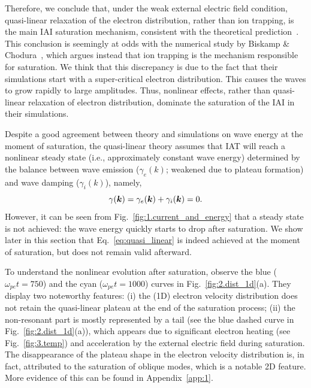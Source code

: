 \documentclass[%
 reprint,
 amsmath,
 amssymb,
 aps,
 prx,
floatfix,
superscriptaddress
]{revtex4-2}
\newcommand\bb[1]{\mbox{\boldmath{$#1$}}}
\begin{document}
Therefore, we conclude that, under the weak external electric field condition, quasi-linear relaxation of the electron distribution, rather than ion trapping, is the main IAI saturation mechanism, consistent with the theoretical prediction~\cite{bychenkov1988ion}. 
This conclusion is seemingly at odds with the numerical study by Biskamp \& Chodura~\cite{biskamp1971computer}, which argues instead that ion trapping is the mechanism responsible for saturation.
We think that this discrepancy is due to the fact that their simulations start with a super-critical electron distribution. 
This causes the waves to grow rapidly to large amplitudes. 
Thus, nonlinear effects, rather than quasi-linear relaxation of electron distribution, dominate the saturation of the IAI in their simulations.


Despite a good agreement between theory and simulations on wave energy at the moment of saturation, the quasi-linear theory assumes that IAT will reach a nonlinear steady state (i.e., approximately constant wave energy) determined by the balance between wave emission ($\gamma_e(k)$; weakened due to plateau formation) and wave damping ($\gamma_i(k)$), namely, 
\begin{equation}
\label{eq:quasi_linear}
    \gamma(\bb{k}) = \gamma_e(\bb{k}) + \gamma_i(\bb{k}) = 0.
\end{equation}
However, it can be seen from Fig.~\ref{fig:1.current_and_energy} that a steady state is not achieved: the wave energy quickly starts to drop after saturation.
We show later in this section that Eq.~\eqref{eq:quasi_linear} is indeed achieved at the moment of saturation, but does not remain valid afterward.

To understand the nonlinear evolution after saturation, observe the blue ($\omega_{pe}t=750$) and the cyan ($\omega_{pe}t=1000$) curves in Fig.~\ref{fig:2.dist_1d}(a). 
They display two noteworthy features: (i) the (1D) electron velocity distribution does not retain the quasi-linear plateau at the end of the saturation process; (ii)
the non-resonant part is mostly represented by a tail (see the blue dashed curve in Fig.~\ref{fig:2.dist_1d}(a)), which appears due to significant electron heating (see Fig.~\ref{fig:3.temp}) and acceleration by the external electric field during saturation.
The disappearance of the plateau shape in the electron velocity distribution is, in fact, attributed to the saturation of oblique modes, which is a notable 2D feature. More evidence of this can be found in Appendix~\ref{app:1}.
\end{document}
